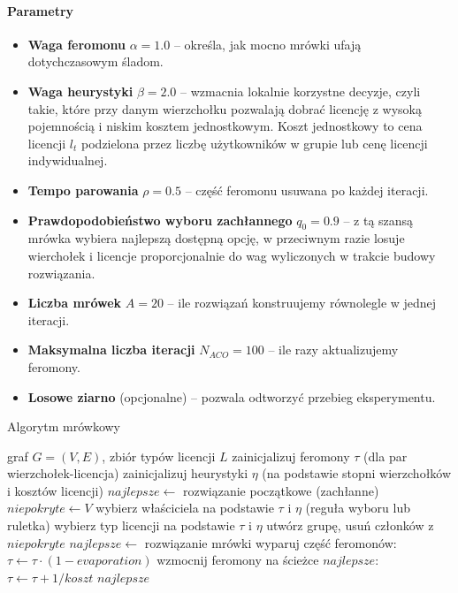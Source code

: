 \paragraph{Parametry}
\begin{itemize}
  \item \textbf{Waga feromonu} $\alpha=1.0$ -- określa, jak mocno mrówki ufają dotychczasowym śladom.
  \item \textbf{Waga heurystyki} $\beta=2.0$ -- wzmacnia lokalnie korzystne decyzje, czyli takie, które przy danym wierzchołku pozwalają dobrać licencję z wysoką pojemnością i niskim kosztem jednostkowym. Koszt jednostkowy to cena licencji $l_t$ podzielona przez liczbę użytkowników w grupie lub cenę licencji indywidualnej.
  \item \textbf{Tempo parowania} $\rho=0.5$ -- część feromonu usuwana po każdej iteracji.
  \item \textbf{Prawdopodobieństwo wyboru zachłannego} $q_0=0.9$ -- z tą szansą mrówka wybiera najlepszą dostępną opcję, w przeciwnym razie losuje wierchołek i licencje proporcjonalnie do wag wyliczonych w trakcie budowy rozwiązania.
  \item \textbf{Liczba mrówek} $A=20$ -- ile rozwiązań konstruujemy równolegle w jednej iteracji.
  \item \textbf{Maksymalna liczba iteracji} $N_{ACO}=100$ -- ile razy aktualizujemy feromony.
  \item \textbf{Losowe ziarno} (opcjonalne) -- pozwala odtworzyć przebieg eksperymentu.
\end{itemize}


\begin{algorithm}[H]
  \caption{Algorytm mrówkowy}
  \label{alg:aco}
  \begin{algorithmic}[1]
    \Require graf $G=(V,E)$, zbiór typów licencji $L$
    \State zainicjalizuj feromony $\tau$ (dla par wierzchołek-licencja)
    \State zainicjalizuj heurystyki $\eta$ (na podstawie stopni wierzchołków i kosztów licencji)
    \State $najlepsze \gets$ rozwiązanie początkowe (zachłanne)
    \State $niepokryte \gets V$
    \State wybierz właściciela na podstawie $\tau$ i $\eta$ (reguła wyboru lub ruletka)
    \State wybierz typ licencji na podstawie $\tau$ i $\eta$
    \State utwórz grupę, usuń członków z $niepokryte$
    \EndWhile
    \State $najlepsze \gets$ rozwiązanie mrówki
    \EndIf
    \EndFor
    \State wyparuj część feromonów: $\tau \gets \tau \cdot (1-evaporation)$
    \State wzmocnij feromony na ścieżce $najlepsze$: $\tau \gets \tau + 1/koszt$
    \EndFor
    \State \Return $najlepsze$
  \end{algorithmic}
\end{algorithm}

